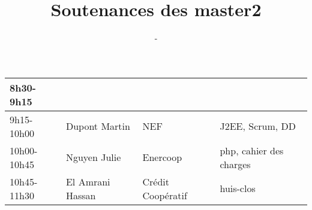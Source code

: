 \documentclass{article}
\title{\huge Soutenances des master2}
\author{\Huge \lemaster}
\date{\huge \ladate - \lasalle}
\begin{document}
\maketitle
\pagestyle{empty}
\Large

\hspace*{-3cm}\begin{tabular}[t]{|l|l|l|l|}\hline
8h30-9h15 & & &\\ \hline
9h15-10h00 & Dupont Martin & NEF & J2EE, Scrum, DD\\ \hline
10h00-10h45 & Nguyen Julie & Enercoop & php, cahier des charges\\ \hline
10h45-11h30 & El Amrani Hassan & Crédit Coopératif & huis-clos\\ \hline
\end{tabular}
\end{document}
